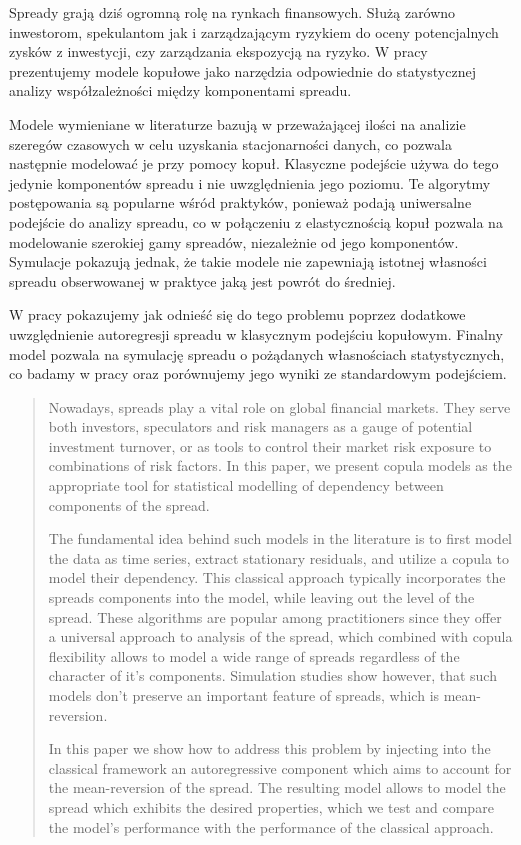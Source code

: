\begin{streszczenie}
	Spready grają dziś ogromną rolę na rynkach finansowych. Służą zarówno inwestorom, spekulantom jak i zarządzającym ryzykiem do oceny potencjalnych zysków z inwestycji, czy zarządzania ekspozycją na ryzyko. W pracy prezentujemy modele kopułowe jako narzędzia odpowiednie do statystycznej analizy współzależności między komponentami spreadu. 
	
	Modele wymieniane w literaturze bazują w przeważającej ilości na analizie szeregów czasowych w celu uzyskania stacjonarności danych, co pozwala następnie modelować je przy pomocy kopuł. Klasyczne podejście używa do tego jedynie komponentów spreadu i nie uwzględnienia jego poziomu. Te algorytmy postępowania są popularne wśród praktyków, ponieważ podają uniwersalne podejście do analizy spreadu, co w połączeniu z elastycznością kopuł pozwala na modelowanie szerokiej gamy spreadów, niezależnie od jego komponentów. Symulacje pokazują jednak, że takie modele nie zapewniają istotnej własności spreadu obserwowanej w praktyce jaką jest powrót do średniej.
	
	W pracy pokazujemy jak odnieść się do tego problemu poprzez dodatkowe uwzględnienie autoregresji spreadu w klasycznym podejściu kopułowym. Finalny model pozwala na symulację spreadu o pożądanych własnościach statystycznych, co badamy w pracy oraz porównujemy jego wyniki ze standardowym podejściem. 
\end{streszczenie}

\begin{abstract}
	Nowadays, spreads play a vital role on global financial markets. They serve both investors, speculators and risk managers as a gauge of potential investment turnover, or as tools to control their market risk exposure to combinations of risk factors. In this paper, we present copula models as the appropriate tool for statistical modelling of dependency between components of the spread.
	
	The fundamental idea behind such models in the literature is to first model the data as time series, extract stationary residuals, and utilize a copula to model their dependency. This classical approach typically incorporates the spreads components into the model, while leaving out the level of the spread. These algorithms are popular among practitioners since they offer a universal approach to analysis of the spread, which combined with copula flexibility allows to model a wide range of spreads regardless of the character of it's components. Simulation studies show however, that such models don't preserve an important feature of spreads, which is mean-reversion.
	
	In this paper we show how to address this problem by injecting into the classical framework an autoregressive component which aims to account for the mean-reversion of the spread. The resulting model allows to model the spread which exhibits the desired properties, which we test and compare the model's performance with the performance of the classical approach.
\end{abstract}
